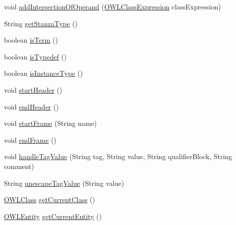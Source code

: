 \begin{DoxyCompactItemize}
\item 
void \hyperlink{classorg_1_1coode_1_1owlapi_1_1obo_1_1parser_1_1_o_b_o_consumer_ae1779e442f0d054fd581a283b68d815e}{add\-Intersection\-Of\-Operand} (\hyperlink{interfaceorg_1_1semanticweb_1_1owlapi_1_1model_1_1_o_w_l_class_expression}{O\-W\-L\-Class\-Expression} class\-Expression)
\item 
String \hyperlink{classorg_1_1coode_1_1owlapi_1_1obo_1_1parser_1_1_o_b_o_consumer_a469d7ad3639352e987d9b00bd8f31040}{get\-Stanza\-Type} ()
\item 
boolean \hyperlink{classorg_1_1coode_1_1owlapi_1_1obo_1_1parser_1_1_o_b_o_consumer_a3f0ce6761d25b9b9d1dd315d74048413}{is\-Term} ()
\item 
boolean \hyperlink{classorg_1_1coode_1_1owlapi_1_1obo_1_1parser_1_1_o_b_o_consumer_a29d8636abdab93670b5ac4755ae4f7f0}{is\-Typedef} ()
\item 
boolean \hyperlink{classorg_1_1coode_1_1owlapi_1_1obo_1_1parser_1_1_o_b_o_consumer_a608f90bb6b1e61da3114ce937c310e56}{is\-Instance\-Type} ()
\item 
void \hyperlink{classorg_1_1coode_1_1owlapi_1_1obo_1_1parser_1_1_o_b_o_consumer_aaa87c4a419fe29c4c8c624362585812d}{start\-Header} ()
\item 
void \hyperlink{classorg_1_1coode_1_1owlapi_1_1obo_1_1parser_1_1_o_b_o_consumer_aa5f1081189f54fc4906bff936bccd403}{end\-Header} ()
\item 
void \hyperlink{classorg_1_1coode_1_1owlapi_1_1obo_1_1parser_1_1_o_b_o_consumer_a0813e455ae3dbf56d7fed656e862152f}{start\-Frame} (String name)
\item 
void \hyperlink{classorg_1_1coode_1_1owlapi_1_1obo_1_1parser_1_1_o_b_o_consumer_ae632c189facd7f61289a667248980efa}{end\-Frame} ()
\item 
void \hyperlink{classorg_1_1coode_1_1owlapi_1_1obo_1_1parser_1_1_o_b_o_consumer_a981d9a7c2746d85291c0e14724e62981}{handle\-Tag\-Value} (String tag, String value, String qualifier\-Block, String comment)
\item 
String \hyperlink{classorg_1_1coode_1_1owlapi_1_1obo_1_1parser_1_1_o_b_o_consumer_a984ec3ec77844f999a8d75ad4b06254a}{unescape\-Tag\-Value} (String value)
\item 
\hyperlink{interfaceorg_1_1semanticweb_1_1owlapi_1_1model_1_1_o_w_l_class}{O\-W\-L\-Class} \hyperlink{classorg_1_1coode_1_1owlapi_1_1obo_1_1parser_1_1_o_b_o_consumer_a244a71f1f08402d449a29b4ecf3e6ea7}{get\-Current\-Class} ()
\item 
\hyperlink{interfaceorg_1_1semanticweb_1_1owlapi_1_1model_1_1_o_w_l_entity}{O\-W\-L\-Entity} \hyperlink{classorg_1_1coode_1_1owlapi_1_1obo_1_1parser_1_1_o_b_o_consumer_a09c923f7b2159b178d0616b051ae4ff3}{get\-Current\-Entity} ()

\end{DoxyCompactItemize}
